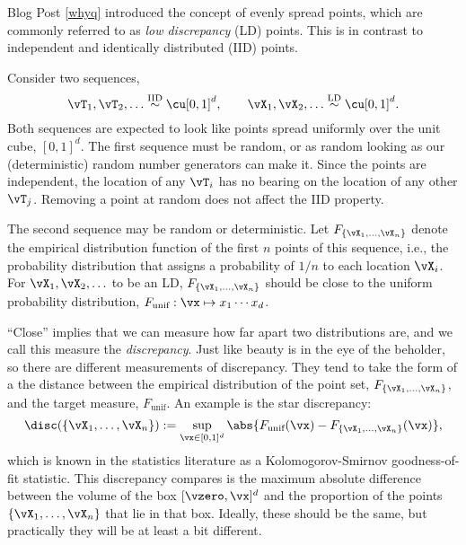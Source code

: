 Blog Post \ref{whyq} introduced the concept of evenly spread points, which are commonly referred to as \emph{low discrepancy} (LD) points.  This is in contrast to independent and identically distributed (IID) points.  

Consider two sequences,
\begin{equation}
    \vT_1, \vT_2, \ldots \overset{\text{IID}}{\sim} \cu[0,1]^d, \qquad \vX_1, \vX_2, \ldots \overset{\text{LD}}{\sim} \cu[0,1]^d.
\end{equation}
Both sequences are expected to look like points spread uniformly over the unit cube, $[0,1]^d$.  
The first sequence must be random, or as random looking as our (deterministic) random number generators can make it.  Since the points are independent, the location of any $\vT_i$ has no bearing on the location of any other $\vT_j$.  Removing a point at random does not affect the IID property.

The second sequence may be random or deterministic.  Let $F_{\{\vX_1, \ldots, \vX_n\}}$ denote the empirical distribution function of the first $n$ points of this sequence, i.e., the probability distribution that assigns a probability of $1/n$ to each location $\vX_i$.  For $\vX_1, \vX_2, \ldots$ to be an LD, $F_{\{\vX_1, \ldots, \vX_n\}}$ should be close to the uniform probability distribution, $F_{\text{unif}}: \vx \mapsto x_1 \cdots x_d$.

``Close'' implies that we can measure how far apart two distributions are, and we call this measure the \emph{discrepancy}. Just like beauty is in the eye of the beholder, so there are different measurements of discrepancy.  They tend to take the form of a the distance between the empirical distribution of the point set, $F_{\{\vX_1, \ldots, \vX_n\}}$, and the target measure, $F_{\text{unif}}$. An example is the star discrepancy:
\begin{equation*}
        \disc(\{\vX_1, \ldots, \vX_n\}) : = \sup_{\vx \in [0,1]^d}  \abs{F_{\text{unif}} (\vx) - F_{\{\vX_1, \ldots, \vX_n\}}(\vx)},
\end{equation*}
which is known in the statistics literature as a Kolomogorov-Smirnov goodness-of-fit statistic.  This discrepancy compares is the maximum absolute difference between the volume of the box $[\vzero,\vx]^d$ and the proportion of the points $\{\vX_1, \ldots, \vX_n\}$ that lie in that box.  Ideally, these should be the same, but practically they will be at least a bit different.

